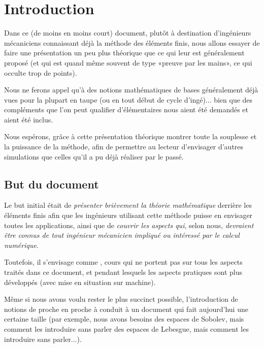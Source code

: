 \documentclass[11pt,pdflatex]{book}
\begin{document}
\chapter*{Introduction}
\ifVersionDuDocEstVincent\else{}\fi
{}

Dans ce (de moins en moins court) document, plutôt à destination d'ingénieurs mécaniciens  connaissant déjà la méthode des éléments finis, nous allons essayer de faire une présentation un peu plus théorique que ce qui leur est généralement proposé (et qui est quand même souvent de type «preuve par les mains», ce qui occulte trop de points).

Nous ne ferons appel qu'à des notions mathématiques de bases généralement déjà vues pour la plupart en taupe (ou en tout début de cycle d'ingé)... bien que des compléments que l'on peut qualifier d'élémentaires nous aient été demandés et aient été inclus.

Nous espérons, grâce à cette présentation théorique montrer toute la souplesse et la puissance de la méthode, afin de permettre au lecteur d'envisager d'autres simulations que celles qu'il a pu déjà réaliser par le passé.





\bigskip
\section*{But du document}

Le but initial était de \emph{présenter brièvement la théorie mathématique} derrière les éléments finis afin que les ingénieurs utilisant cette méthode puisse en envisager toutes les applications, ainsi que de \emph{couvrir les aspects qui}, selon nous, \emph{devraient être connus de tout ingénieur mécanicien impliqué ou intéressé par le calcul numérique}.

Toutefois, il s'envisage comme , cours qui ne portent pas sur tous les aspects traités dans ce document, et pendant lesquels les aspects pratiques sont plus développés (avec mise en situation sur machine).

\medskip
Même si nous avons voulu rester le plus succinct possible, l'introduction de notions de proche en proche à conduit à un document qui fait aujourd'hui une certaine taille (par exemple, nous avons besoins des espaces de Sobolev, mais comment les introduire sans parler des espaces de Lebesgue, mais comment les introduire sans parler...).
\end{document}
